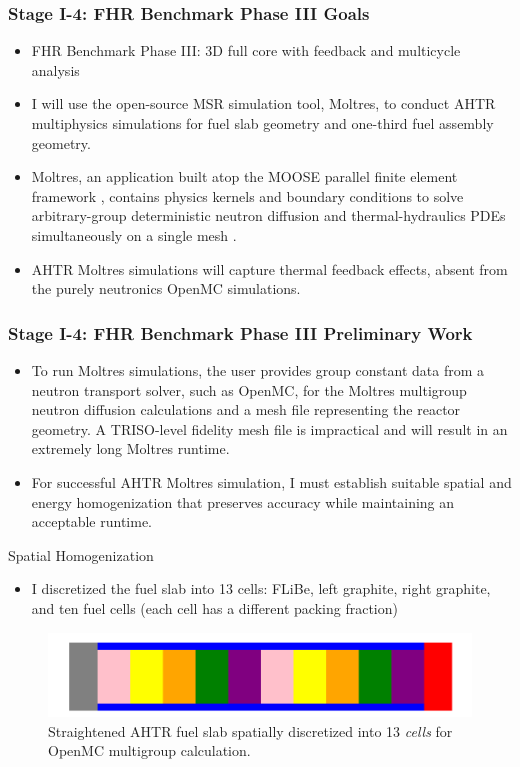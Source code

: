 \begin{frame}
    \frametitle{Stage I-4: FHR Benchmark Phase III Goals}
    \begin{itemize}
        \item FHR Benchmark Phase III: 3D full core with feedback and multicycle 
        analysis
        \item I will use the open-source MSR simulation tool, Moltres, to conduct
        AHTR multiphysics simulations for fuel slab geometry and one-third 
        fuel assembly geometry. 
        \item Moltres, an application built atop the 
        \gls{MOOSE} parallel finite element framework \cite{gaston_moose:_2009}, 
        contains physics kernels and boundary conditions to solve arbitrary-group 
        deterministic neutron diffusion and thermal-hydraulics \glspl{PDE} 
        simultaneously on a single mesh \cite{lindsay_introduction_2018,park_advancement_2020}. 
        \item AHTR Moltres simulations will capture thermal feedback effects, 
        absent from the purely neutronics OpenMC simulations.  
    \end{itemize}
\end{frame}

\begin{frame}
    \frametitle{Stage I-4: FHR Benchmark Phase III Preliminary Work}
    \begin{itemize}
        \item To run Moltres simulations, the user provides group constant data from a neutron 
        transport solver, such as OpenMC, for the Moltres multigroup neutron diffusion 
        calculations and a mesh file representing the reactor geometry. 
        A TRISO-level fidelity mesh file is impractical and will result in an extremely 
        long Moltres runtime. 
        \item For successful AHTR Moltres simulation, I must establish 
        suitable spatial and energy homogenization that preserves accuracy while 
        maintaining an acceptable runtime.
    \end{itemize}
\begin{block}{Spatial Homogenization}
    \begin{itemize}
        \item I discretized the fuel slab into 13 cells: FLiBe, left graphite, right graphite, 
    and ten fuel cells (each cell has a different packing fraction)
    \end{itemize}
    \vspace{-0.3cm}
    \begin{figure}[]
        \includegraphics[width=0.7\linewidth]{../docs/figures/straightened_slab_mg.png}
        \caption{Straightened AHTR fuel slab spatially discretized into 
        13 \textit{cells} for OpenMC multigroup calculation.}
    \end{figure}
\end{block}
\end{frame}

